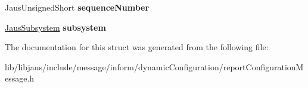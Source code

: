 \begin{DoxyCompactItemize}
\item 
\hypertarget{struct_report_configuration_message_struct_a24e74d2f7e8efdd3f38e4f6eba0dcc49}{\-Jaus\-Unsigned\-Short {\bfseries sequence\-Number}}\label{struct_report_configuration_message_struct_a24e74d2f7e8efdd3f38e4f6eba0dcc49}

\item 
\hypertarget{struct_report_configuration_message_struct_aabd7a3659a6abfe2157b2a0aa459f732}{\hyperlink{struct_jaus_subsystem_struct}{\-Jaus\-Subsystem} {\bfseries subsystem}}\label{struct_report_configuration_message_struct_aabd7a3659a6abfe2157b2a0aa459f732}

\end{DoxyCompactItemize}


\-The documentation for this struct was generated from the following file\-:\begin{DoxyCompactItemize}
\item 
lib/libjaus/include/message/inform/dynamic\-Configuration/report\-Configuration\-Message.\-h\end{DoxyCompactItemize}
